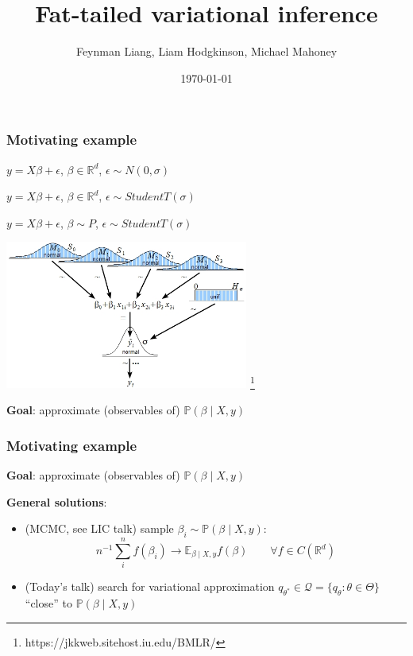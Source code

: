 \documentclass{beamer}
\title{Fat-tailed variational inference}
\author{Feynman Liang, Liam Hodgkinson, Michael Mahoney}
\institute{UC Berkeley}
\date{\today}
\newcommand{\eps}{\epsilon}
\newcommand{\EE}{\mathbb{E}}
\newcommand{\PP}{\mathbb{P}}
\newcommand{\RR}{\mathbb{R}}
\newcommand{\cQ}{\mathcal{Q}}
\begin{document}
\frame{\titlepage}

\begin{frame}
    \frametitle{Motivating example}

    \begin{description}[leftmargin=!,labelwidth=\widthof{\bfseries b}]
        \item[Linear regression] $y = X \beta + \eps$, $\beta \in \RR^d$, $\eps\sim N(0,\sigma)$

        \item[Robust regression] $y = X \beta + \eps$, $\beta \in \RR^d$, $\eps\sim StudentT(\sigma)$

        \item[Bayesian robust regression] $y = X \beta + \eps$, $\beta \sim P$\;, $\eps\sim StudentT(\sigma)$
    \end{description}

    \begin{center}
        \includegraphics[width=0.6\textwidth]{Figures/bmlr.jpg}
        \footnote{https://jkkweb.sitehost.iu.edu/BMLR/}
    \end{center}
    \textbf{Goal}: approximate (observables of) $\PP(\beta \mid X, y)$

\end{frame}

\begin{frame}
    \frametitle{Motivating example}

    \textbf{Goal}: approximate (observables of) $\PP(\beta \mid X, y)$

    \textbf{General solutions}:
    \begin{itemize}
        \item (MCMC, see LIC talk) sample $\beta_i \sim \PP(\beta \mid X, y)$:
              \[
                  n^{-1} \sum_i^n f(\beta_i) \to \EE_{\beta \mid X, y} f(\beta)
                  \qquad \forall f \in C(\RR^d)
              \]
        \item (Today's talk) search for variational approximation
              $q_{\theta^*} \in \cQ = \{q_\theta : \theta \in \Theta\}$
              ``close'' to $\PP(\beta \mid X, y)$
    \end{itemize}

\end{frame}
\end{document}
